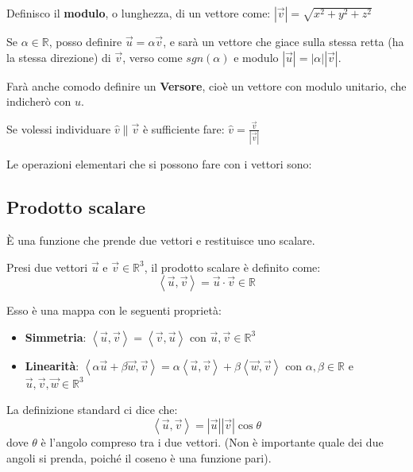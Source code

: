 Definisco il \textbf{modulo}, o lunghezza, di un vettore come: $\left | \vec v\right |=\sqrt{x^2 + y^2 +z^2} $

Se $\alpha \in \mathbb{R}$, posso definire $\vec u = \alpha \vec v$, e sarà un vettore che giace sulla stessa retta (ha la stessa direzione) di $\vec v$, verso come $sgn (\alpha)$ e modulo $\left | \vec u\right |=\left |\alpha \right |\left |\vec v\right |$.

Farà anche comodo definire un \textbf{Versore}, cioè un vettore con modulo unitario, che indicherò con $\hat u$.

\begin{example}
    Se volessi individuare $\hat v \parallel  \vec v$ è sufficiente fare: $\hat v = \frac{\vec v}{|\vec v|}$
\end{example}

Le operazioni elementari che si possono fare con i vettori sono:

\subsection{Prodotto scalare}
È una funzione che prende due vettori e restituisce uno scalare.

Presi due vettori $\vec u$ e $\vec v \in \mathbb{R}^3$, il prodotto scalare è definito come:
\begin{equation*}
    \left< \vec u, \vec v \right> = \vec u \cdot \vec v \in \mathbb{R}
\end{equation*}

Esso è una mappa con le seguenti proprietà:
\begin{itemize}
    \item \textbf{Simmetria}: $\left< \vec u, \vec v \right> = \left< \vec v, \vec u \right> $ con $\vec u, \vec v \in \mathbb{R}^3$
    \item \textbf{Linearità}: $\left< \alpha \vec u + \beta \vec w, \vec v \right> = \alpha \left< \vec u, \vec v \right> + \beta \left< \vec w, \vec v \right> $ con $\alpha, \beta \in \mathbb{R}$ e $\vec u, \vec v, \vec w \in \mathbb{R}^3$
\end{itemize}

La definizione standard ci dice che:
\begin{equation*}
    \left< \vec u, \vec v \right> = |\vec u||\vec v|\cos \theta
\end{equation*}
dove $\theta$ è l'angolo compreso tra i due vettori. (Non è importante quale dei due angoli si prenda, poiché il coseno è una funzione pari).


